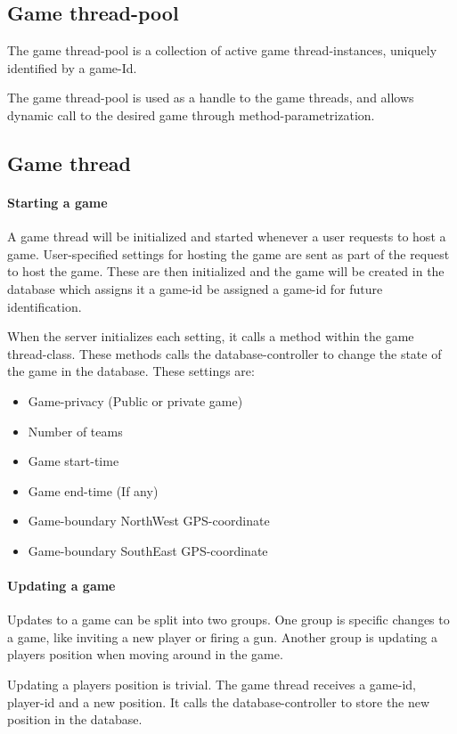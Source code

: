 \subsection{Game thread-pool}
The game thread-pool is a collection of active game thread-instances, uniquely identified by a game-Id.

The game thread-pool is used as a handle to the game threads, and allows dynamic call to the desired game through method-parametrization. 

\subsection{Game thread}
\paragraph{Starting a game}
A game thread will be initialized and started whenever a user requests to host a game. User-specified settings for hosting the game are sent as part of the request to host the game. These are then initialized and the game will be created in the database which assigns it a game-id be assigned a game-id for future identification.

When the server initializes each setting, it calls a method within the game thread-class. These methods calls the database-controller to change the state of the game in the database. These settings are:
\begin{itemize}
\item Game-privacy (Public or private game)
\item Number of teams
\item Game start-time
\item Game end-time (If any)
\item Game-boundary NorthWest GPS-coordinate
\item Game-boundary SouthEast GPS-coordinate
\end{itemize}

\paragraph{Updating a game}
Updates to a game can be split into two groups. One group is specific changes to a game, like inviting a new player or firing a gun. Another group is updating a players position when moving around in the game.

Updating a players position is trivial. The game thread receives a game-id, player-id and a new position. It calls the database-controller to store the new position in the database.

